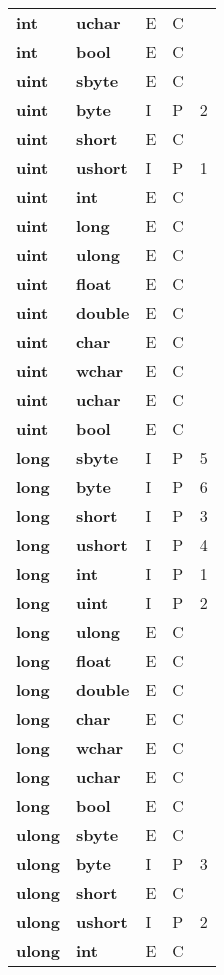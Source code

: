 \documentclass[a4paper,oneside,11pt]{book}
\theoremstyle{definition}
\begin{document}
\begin{flushleft}
\begin{supertabular}{lllll}
\textbf{int}& \textbf{uchar}& E& C&\\
\textbf{int}& \textbf{bool}& E& C&\\
\hline
\textbf{uint}& \textbf{sbyte}& E& C&\\
\textbf{uint}& \textbf{byte}& I& P&2\\
\textbf{uint}& \textbf{short}& E& C&\\
\textbf{uint}& \textbf{ushort}& I& P&1\\
\textbf{uint}& \textbf{int}& E& C&\\
\textbf{uint}& \textbf{long}& E& C&\\
\textbf{uint}& \textbf{ulong}& E& C&\\
\textbf{uint}& \textbf{float}& E& C&\\
\textbf{uint}& \textbf{double}& E& C&\\
\textbf{uint}& \textbf{char}& E& C&\\
\textbf{uint}& \textbf{wchar}& E& C&\\
\textbf{uint}& \textbf{uchar}& E& C&\\
\textbf{uint}& \textbf{bool}& E& C&\\
\hline
\textbf{long}& \textbf{sbyte}& I& P&5\\
\textbf{long}& \textbf{byte}& I& P&6\\
\textbf{long}& \textbf{short}& I& P&3\\
\textbf{long}& \textbf{ushort}& I& P&4\\
\textbf{long}& \textbf{int}& I& P&1\\
\textbf{long}& \textbf{uint}& I& P&2\\
\textbf{long}& \textbf{ulong}& E& C&\\
\textbf{long}& \textbf{float}& E& C&\\
\textbf{long}& \textbf{double}& E& C&\\
\textbf{long}& \textbf{char}& E& C&\\
\textbf{long}& \textbf{wchar}& E& C&\\
\textbf{long}& \textbf{uchar}& E& C&\\
\textbf{long}& \textbf{bool}& E& C&\\
\hline
\textbf{ulong}& \textbf{sbyte}& E& C&\\
\textbf{ulong}& \textbf{byte}& I& P&3\\
\textbf{ulong}& \textbf{short}& E& C&\\
\textbf{ulong}& \textbf{ushort}& I& P&2\\
\textbf{ulong}& \textbf{int}& E& C&\\

\end{supertabular}
\end{flushleft}
\end{document}
